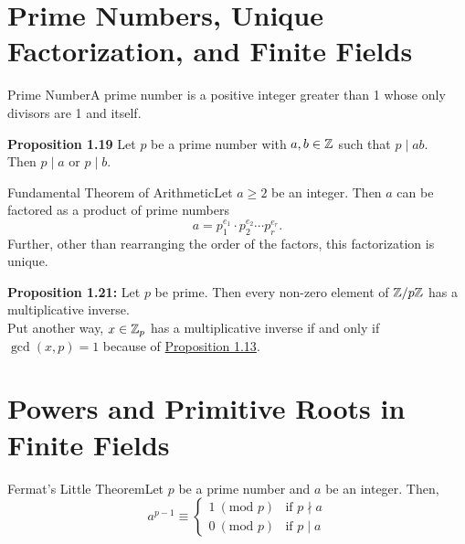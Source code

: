 \section{Prime Numbers, Unique Factorization, and Finite Fields}

\begin{definition}
    {Prime Number}A prime number is a positive integer greater than 1 whose only divisors are 1 and itself.
\end{definition}

\textbf{Proposition 1.19} Let \(p\) be a prime number with \(a,b \in \mathbb{Z}\) such that \(p \mid ab\). \\
Then \(p \mid a\) or \(p \mid b\). \\

\begin{theorem}
    {Fundamental Theorem of Arithmetic}Let \(a \geq 2\) be an integer. Then \(a\) can be factored as a product of prime numbers \[a = p_1^{e_1} \cdot p_2^{e_2} \cdots p_r^{e_r}.\] Further, other than rearranging the order of the factors, this factorization is unique.
\end{theorem}

\textbf{Proposition 1.21:} Let \(p\) be prime. Then every non-zero element of \(\mathbb{Z}/p\mathbb{Z}\) has a multiplicative inverse. \\

Put another way, \(x \in \mathbb{Z}_p\) has a multiplicative inverse if and only if \(\gcd(x,p) = 1\) because of \hyperlink{prop 1.13}{Proposition 1.13}. \\


\pfs%

\section{Powers and Primitive Roots in Finite Fields}

\begin{theorem}
    {Fermat's Little Theorem}Let \(p\) be a prime number and \(a\) be an integer. Then, \[a^{p - 1} \equiv \begin{cases}
        1 \ (\text{mod } p) & \text{if } p \nmid a \\
        0 \ (\text{mod } p) & \text{if } p \mid a
    \end{cases}\]
\end{theorem}

